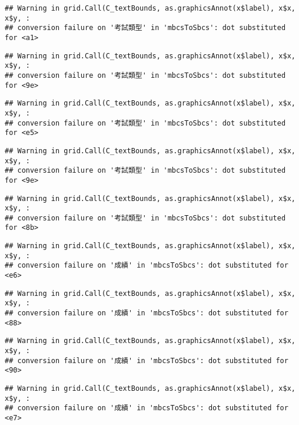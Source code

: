 \documentclass[
]{book}
\begin{document}
\begin{verbatim}
## Warning in grid.Call(C_textBounds, as.graphicsAnnot(x$label), x$x, x$y, :
## conversion failure on '考試類型' in 'mbcsToSbcs': dot substituted for <a1>
\end{verbatim}

\begin{verbatim}
## Warning in grid.Call(C_textBounds, as.graphicsAnnot(x$label), x$x, x$y, :
## conversion failure on '考試類型' in 'mbcsToSbcs': dot substituted for <9e>
\end{verbatim}

\begin{verbatim}
## Warning in grid.Call(C_textBounds, as.graphicsAnnot(x$label), x$x, x$y, :
## conversion failure on '考試類型' in 'mbcsToSbcs': dot substituted for <e5>
\end{verbatim}

\begin{verbatim}
## Warning in grid.Call(C_textBounds, as.graphicsAnnot(x$label), x$x, x$y, :
## conversion failure on '考試類型' in 'mbcsToSbcs': dot substituted for <9e>
\end{verbatim}

\begin{verbatim}
## Warning in grid.Call(C_textBounds, as.graphicsAnnot(x$label), x$x, x$y, :
## conversion failure on '考試類型' in 'mbcsToSbcs': dot substituted for <8b>
\end{verbatim}

\begin{verbatim}
## Warning in grid.Call(C_textBounds, as.graphicsAnnot(x$label), x$x, x$y, :
## conversion failure on '成績' in 'mbcsToSbcs': dot substituted for <e6>
\end{verbatim}

\begin{verbatim}
## Warning in grid.Call(C_textBounds, as.graphicsAnnot(x$label), x$x, x$y, :
## conversion failure on '成績' in 'mbcsToSbcs': dot substituted for <88>
\end{verbatim}

\begin{verbatim}
## Warning in grid.Call(C_textBounds, as.graphicsAnnot(x$label), x$x, x$y, :
## conversion failure on '成績' in 'mbcsToSbcs': dot substituted for <90>
\end{verbatim}

\begin{verbatim}
## Warning in grid.Call(C_textBounds, as.graphicsAnnot(x$label), x$x, x$y, :
## conversion failure on '成績' in 'mbcsToSbcs': dot substituted for <e7>
\end{verbatim}
\end{document}
